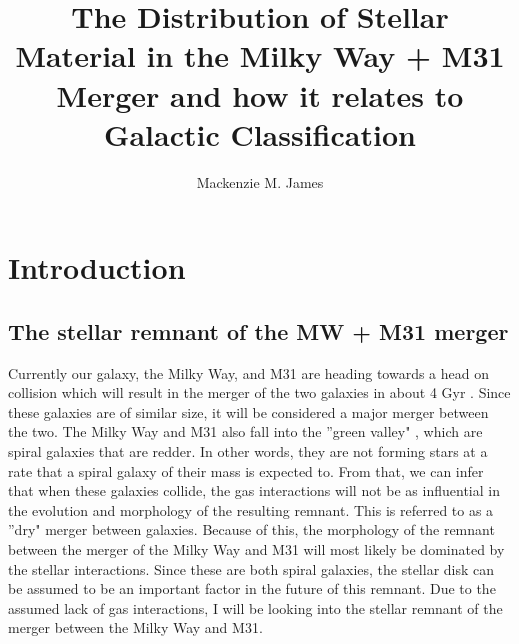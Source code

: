 \documentclass[twocolumn]{aastex63}
\begin{document}
\title{The Distribution of Stellar Material in the Milky Way + M31 Merger and how it relates to Galactic Classification}

\author{Mackenzie M. James}




\section{Introduction}

\subsection{The stellar remnant of the MW + M31 merger}
Currently our galaxy, the Milky Way, and M31 are heading towards a head on collision which will result in the merger of the two galaxies in about 4 Gyr \citep{2012ApJ...753....9V}. Since these galaxies are of similar size, it will be considered a major merger between the two. The Milky Way and M31 also fall into the ''green valley" \citep{2011ApJ...736...84M}, which are spiral galaxies that are redder. In other words, they are not forming stars at a rate that a spiral galaxy of their mass is expected to. From that, we can infer that when these galaxies collide, the gas interactions will not be as influential in the evolution and morphology of the resulting remnant. This is referred to as a ''dry" merger between galaxies. Because of this, the morphology of the remnant between the merger of the Milky Way and M31 will most likely be dominated by the stellar interactions. Since these are both spiral galaxies, the stellar disk can be assumed to be an important factor in the future of this remnant. Due to the assumed lack of gas interactions, I will be looking into the stellar remnant of the merger between the Milky Way and M31.
\end{document}
